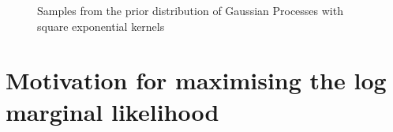 \documentclass{article}
\begin{document}
\begin{figure}[ht]
    \centering
    \caption{Samples from the prior distribution of Gaussian Processes with square exponential kernels}
    \label{fig:prior_samples}
\end{figure}


\section{Motivation for maximising the log marginal likelihood}\label{appendix:why_lml}



\end{document}
